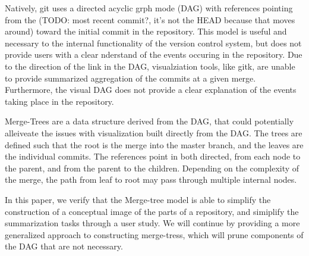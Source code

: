 Natively, git uses a directed acyclic grph mode (DAG) with references pointing from
the (TODO: most recent commit?, it's not the HEAD because that moves around) toward
the initial commit in the repository. This model is useful and necessary to the
internal functionality of the version control system, but does not provide users
with a clear nderstand of the events occuring in the repository. Due to the
direction of the link in the DAG, visualziation tools, like gitk, are unable to
provide summarized aggregation of the commits at a given merge. Furthermore, the
visual DAG does not provide a clear explanation of the events taking place in the
repository.

Merge-Trees are a data structure derived from the DAG, that could potentially
alleiveate the issues with visualization built directly from the DAG. The trees are
defined such that the root is the merge into the master branch, and the leaves are
the individual commits. The references point in both directed, from each node to the
parent, and from the parent to the children. Depending on the complexity of the
merge, the path from leaf to root may pass through multiple internal nodes.

In this paper, we verify that the Merge-tree model is able to simplify the
construction of a conceptual image of the parts of a repository, and simiplify the
summarization tasks through a user study. We will continue by providing a more
generalized approach to constructing merge-tress, which will prune components of the
DAG that are not necessary.


